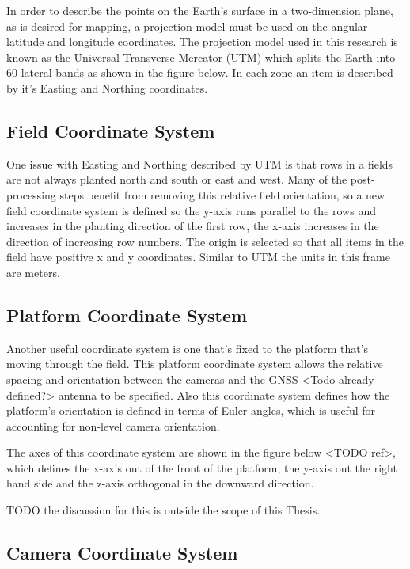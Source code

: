 In order to describe the points on the Earth's surface in a two-dimension plane, as is desired for mapping, a projection model must be used on the angular latitude and longitude coordinates.  The projection model used in this research is known as the Universal Transverse Mercator (UTM) which splits the Earth into 60 lateral bands as shown in the figure below.  In each zone an item is described by it's Easting and Northing coordinates.  

\subsection{Field Coordinate System}

One issue with Easting and Northing described by UTM is that rows in a fields are not always planted north and south or east and west.  Many of the post-processing steps benefit from removing this relative field orientation, so a new field coordinate system is defined so the y-axis runs parallel to the rows and increases in the planting direction of the first row, the x-axis increases in the direction of increasing row numbers.  The origin is selected so that all items in the field have positive x and y coordinates.   Similar to UTM the units in this frame are meters.

\subsection{Platform Coordinate System}

Another useful coordinate system is one that's fixed to the platform that's moving through the field.  This platform coordinate system allows the relative spacing and orientation between the cameras and the GNSS <Todo already defined?> antenna to be specified.   Also this coordinate system defines how the platform's orientation is defined in terms of Euler angles, which is useful for accounting for non-level camera orientation. 

The axes of this coordinate system are shown in the figure below <TODO ref>, which defines the x-axis out of the front of the platform, the y-axis out the right hand side and the z-axis orthogonal in the downward direction.  

TODO the discussion for this is outside the scope of this Thesis. 

\subsection{Camera Coordinate System}

